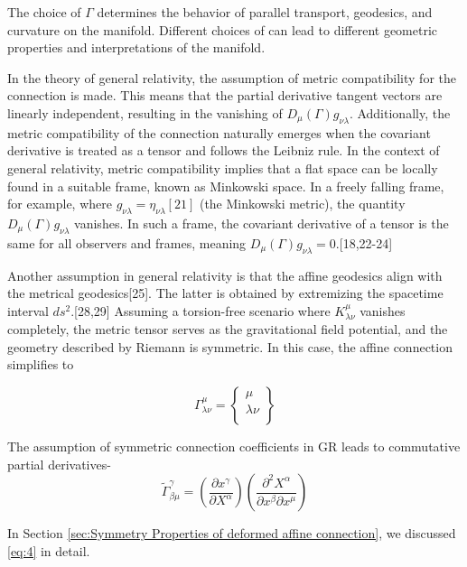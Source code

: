 \documentclass{article}
\begin{document}
The choice of $\Gamma$
 determines the behavior of parallel transport, geodesics, and curvature on the manifold. Different choices of  can lead to different geometric properties and interpretations of the manifold.


In the theory of general relativity, the assumption of metric compatibility for the connection is made. This means that the partial derivative tangent vectors are linearly 
independent, resulting in the vanishing of $D_{\mu}(\Gamma)g_{\nu\lambda}
$. Additionally, the metric compatibility of the connection naturally emerges when the covariant derivative is treated as a tensor and follows the Leibniz rule.
In the context of general relativity, metric compatibility implies that a flat space can be locally found in a suitable frame, known as Minkowski space. In a freely falling frame, for example, where $g_{\nu\lambda} = \eta_{\nu\lambda} [21]
$ (the Minkowski metric), the quantity $D_{\mu}(\Gamma)g_{\nu\lambda}$ vanishes. In such a frame, the covariant derivative of a tensor is the same for all observers and frames, meaning $D_{\mu}(\Gamma)g_{\nu\lambda}=0$.[18,22-24]

Another assumption in general relativity is that the affine geodesics align with the metrical geodesics[25]. The latter is obtained by extremizing the spacetime interval $ds^2$.[28,29] Assuming a torsion-free scenario where ${K^\mu_{\lambda\nu}}
$ vanishes completely, the metric tensor serves as the gravitational field potential, and the geometry described by Riemann is symmetric. In this case, the affine connection simplifies to

\begin{equation}
    \Gamma^{\mu}_{\lambda\nu} = \begin{Bmatrix}
\mu \\
\lambda \nu \\
\end{Bmatrix}
\label{eq:3}
\end{equation}

The assumption of symmetric connection coefficients in GR leads to commutative partial derivatives-
\begin{equation}
  \widetilde{\Gamma}^
{\gamma}_{\beta\mu} = \left(\frac{\partial x^{\gamma}}{\partial X^{\alpha}}\right) \left(\frac{\partial^2 X^{\alpha}}{\partial x^{\beta}\partial x^{\mu}}\right)
\label{eq:4}
\end{equation}


In Section \ref{sec:Symmetry Properties of deformed affine connection}, we discussed \eqref{eq:4} in detail.
\end{document}

